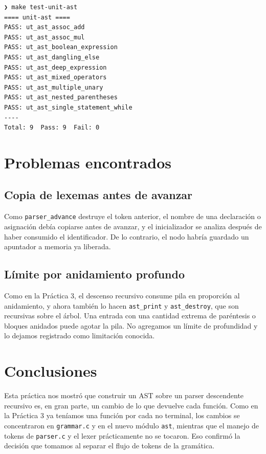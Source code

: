 \documentclass[12pt,letterpaper]{article}
\begin{document}
\begin{verbatim}
❯ make test-unit-ast                                      
==== unit-ast ====
PASS: ut_ast_assoc_add
PASS: ut_ast_assoc_mul
PASS: ut_ast_boolean_expression
PASS: ut_ast_dangling_else
PASS: ut_ast_deep_expression
PASS: ut_ast_mixed_operators
PASS: ut_ast_multiple_unary
PASS: ut_ast_nested_parentheses
PASS: ut_ast_single_statement_while
----
Total: 9  Pass: 9  Fail: 0
\end{verbatim}

\section*{Problemas encontrados}\label{sec:problemas}

\subsection*{Copia de lexemas antes de avanzar}

Como \texttt{parser\_advance} destruye el token anterior, el nombre de una declaración o asignación debía
copiarse antes de avanzar, y el inicializador se analiza después de haber consumido el identificador. De lo
contrario, el nodo habría guardado un apuntador a memoria ya liberada.

\subsection*{Límite por anidamiento profundo}

Como en la Práctica 3, el descenso recursivo consume pila en proporción al anidamiento, y ahora también lo
hacen \texttt{ast\_print} y \texttt{ast\_destroy}, que son recursivas sobre el árbol. Una entrada con una
cantidad extrema de paréntesis o bloques anidados puede agotar la pila. No agregamos un límite de profundidad
y lo dejamos registrado como limitación conocida. 

\section*{Conclusiones}
Esta práctica nos mostró que construir un AST sobre un parser descendente recursivo es, en gran parte, un
cambio de lo que devuelve cada función. Como en la Práctica 3 ya teníamos una función por cada no terminal,
los cambios se concentraron en \texttt{grammar.c} y en el nuevo módulo \texttt{ast}, mientras que el manejo
de tokens de \texttt{parser.c} y el lexer prácticamente no se tocaron. Eso confirmó la decisión que tomamos al
separar el flujo de tokens de la gramática.\\
\end{document}
